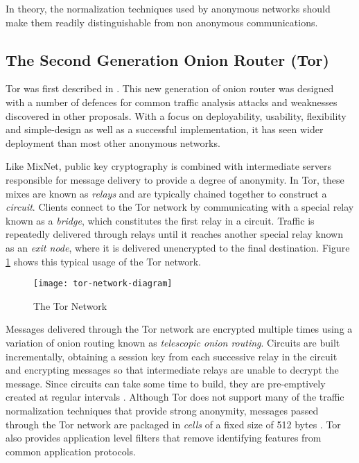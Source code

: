 \documentclass{ecuthesis}
\begin{document}
In theory, the normalization techniques used by anonymous networks should make
them readily distinguishable from non anonymous communications.

\subsection{The Second Generation Onion Router (Tor)}

Tor was first described in 
\parencite{Dingledine:2004p314}. This new generation of onion router was
designed with a number of defences for common traffic analysis attacks and
weaknesses discovered in other proposals. With a focus on deployability,
usability, flexibility and simple-design \parencite[p. 3-4]{Dingledine:2004p314}
as well as a successful implementation, it has seen wider deployment than most
other anonymous networks.

Like MixNet, public key cryptography is combined with intermediate servers
responsible for message delivery to provide a degree of anonymity. In Tor,
these mixes are known as \emph{relays} and are typically chained together to
construct a \emph{circuit}. Clients connect to the Tor network by communicating
with a special relay known as a \emph{bridge}, which constitutes the first
relay in a circuit. Traffic is repeatedly delivered through relays until it
reaches another special relay known as an \emph{exit node}, where it is
delivered unencrypted to the final destination. Figure \ref{tor-network} shows
this typical usage of the Tor network.

\begin{figure}[H]
  \centering\texttt{[image: tor-network-diagram]}
  \caption{The Tor Network}
  \label{tor-network}
\end{figure}

Messages delivered through the Tor network are encrypted multiple times using a
variation of onion routing \parencite{Michael:2001} known as \emph{telescopic
onion routing}. Circuits are built incrementally, obtaining a session key from
each successive relay in the circuit and encrypting messages so that
intermediate relays are unable to decrypt the message. Since circuits can take
some time to build, they are pre-emptively created at regular intervals
\parencite[p. 5]{Dingledine:2004p314}. Although Tor does not support many of
the traffic normalization techniques that provide strong anonymity, messages
passed through the Tor network are packaged in \emph{cells} of a fixed size of
512 bytes \parencite[p. 5]{Dingledine:2004p314}. Tor also provides application
level filters that remove identifying features from common application
protocols.
\end{document}
